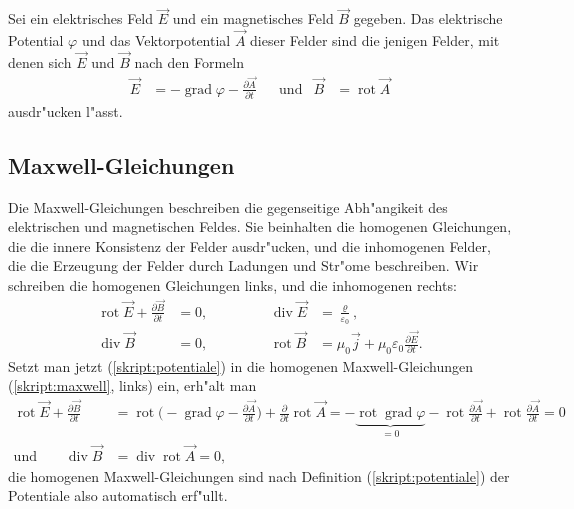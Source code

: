 \begin{definition}
%
Sei ein elektrisches Feld $\vec E$ und ein magnetisches Feld $\vec B$
gegeben.
Das elektrische Potential $\varphi$ und das Vektorpotential $\vec A$ 
dieser Felder sind die jenigen Felder, mit denen sich $\vec E$ und $\vec B$
nach den Formeln
\begin{equation}
\begin{aligned}
\vec E
&=
-\operatorname{grad}\varphi
-\frac{\partial\vec A}{\partial t}
&&\text{und}&
\vec B
&=
\operatorname{rot}\vec A
\end{aligned}
\label{skript:potentiale}
\end{equation}
ausdr"ucken l"asst.
\end{definition}

\subsection{Maxwell-Gleichungen}
%
Die Maxwell-Gleichungen beschreiben die gegenseitige Abh"angikeit 
des elektrischen und magnetischen Feldes. 
Sie beinhalten die homogenen Gleichungen, die die innere Konsistenz
der Felder ausdr"ucken, und die inhomogenen Felder, die die Erzeugung
der Felder durch Ladungen und Str"ome beschreiben.
Wir schreiben die homogenen Gleichungen links, und die inhomogenen
rechts:
\begin{equation}
\begin{aligned}
\operatorname{rot}\vec E+\frac{\partial\vec B}{\partial t}&=0,
&\qquad&&
\operatorname{div}\vec E&=\frac{\varrho}{\varepsilon_0},
\\
\operatorname{div}\vec B&=0,
&\qquad&&
\operatorname{rot}\vec B&=\mu_0\vec j+\mu_0\varepsilon_0\frac{\partial\vec E}{\partial t}.
\end{aligned}
\label{skript:maxwell}
\end{equation}
Setzt man jetzt (\ref{skript:potentiale}) in die homogenen
Maxwell-Gleichungen (\ref{skript:maxwell}, links) ein, erh"alt man
\begin{align*}
\operatorname{rot}\vec E+\frac{\partial\vec B}{\partial t}
&=
\operatorname{rot}\biggl(
-\operatorname{grad}\varphi-\frac{\partial\vec A}{\partial t}
\biggr)
+\frac{\partial}{\partial t}\operatorname{rot}\vec A
=
-\underbrace{\operatorname{rot}\operatorname{grad}\varphi}_{=0}
-\operatorname{rot}\frac{\partial\vec A}{\partial t}
+\operatorname{rot}\frac{\partial\vec A}{\partial t}
=0
\\
\text{und}\qquad
\operatorname{div}\vec B&=\operatorname{div}\operatorname{rot}\vec A=0,
\end{align*}
die homogenen Maxwell-Gleichungen sind nach Definition
(\ref{skript:potentiale}) der Potentiale also automatisch erf"ullt.

